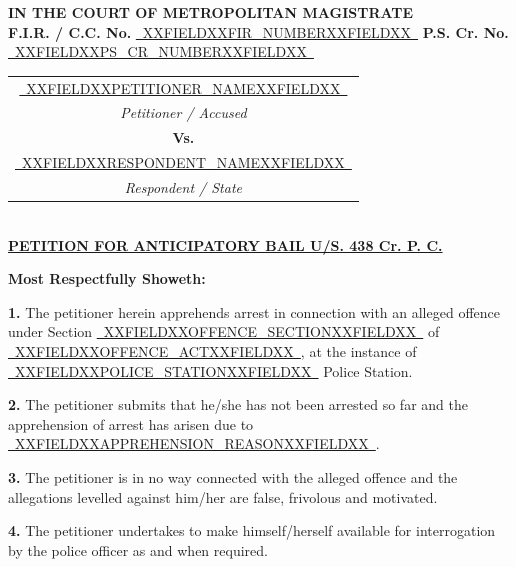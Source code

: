 \documentclass[12pt, a4paper]{article}
\newcommand{\fillline}[1]{\underline{~#1~}}
\begin{document}
\begin{center}
    {\large \textbf{IN THE COURT OF METROPOLITAN MAGISTRATE}} \\[6pt]
    {\normalsize \textbf{F.I.R. / C.C. No.} \fillline{XXFIELDXXFIR_NUMBERXXFIELDXX} \quad \textbf{P.S. Cr. No.} \fillline{XXFIELDXXPS_CR_NUMBERXXFIELDXX}} \\[10pt]
    \begin{tabular}{c}
        \fillline{XXFIELDXXPETITIONER_NAMEXXFIELDXX} \\
        \textit{Petitioner / Accused} \\[6pt]
        \textbf{Vs.} \\[6pt]
        \fillline{XXFIELDXXRESPONDENT_NAMEXXFIELDXX} \\
        \textit{Respondent / State}
    \end{tabular}
    \\[14pt]
    {\large \textbf{\uline{PETITION FOR ANTICIPATORY BAIL U/S. 438 Cr. P. C.}}}
\end{center}

\vspace{10pt}

\noindent \textbf{Most Respectfully Showeth:}

\vspace{8pt}
\noindent \textbf{1.} The petitioner herein apprehends arrest in connection with an alleged offence under Section \fillline{XXFIELDXXOFFENCE_SECTIONXXFIELDXX} of \fillline{XXFIELDXXOFFENCE_ACTXXFIELDXX}, at the instance of \fillline{XXFIELDXXPOLICE_STATIONXXFIELDXX} Police Station.

\vspace{8pt}
\noindent \textbf{2.} The petitioner submits that he/she has not been arrested so far and the apprehension of arrest has arisen due to \fillline{XXFIELDXXAPPREHENSION_REASONXXFIELDXX}.

\vspace{8pt}
\noindent \textbf{3.} The petitioner is in no way connected with the alleged offence and the allegations levelled against him/her are false, frivolous and motivated.

\vspace{8pt}
\noindent \textbf{4.} The petitioner undertakes to make himself/herself available for interrogation by the police officer as and when required.
\end{document}
